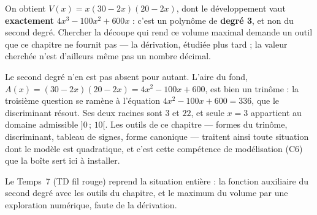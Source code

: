 On obtient $V(x) = x(30 - 2x)(20 - 2x)$, dont le développement vaut
\textbf{exactement} $4x^3 - 100x^2 + 600x$ : c'est un polynôme de
\textbf{degré 3}, et non du second degré. Chercher la découpe qui rend ce volume
maximal demande un outil que ce chapitre ne fournit pas — la dérivation, étudiée
plus tard ; la valeur cherchée n'est d'ailleurs même pas un nombre décimal.

Le second degré n'en est pas absent pour autant. L'aire du fond,
$A(x) = (30-2x)(20-2x) = 4x^2 - 100x + 600$, est bien un trinôme : la troisième
question se ramène à l'équation $4x^2 - 100x + 600 = 336$, que le discriminant
résout. Ses deux racines sont $3$ et $22$, et seule $x = 3$ appartient au domaine
admissible $]0\,;\,10[$. Les outils de ce chapitre — formes du trinôme,
discriminant, tableau de signes, forme canonique — traitent ainsi toute situation
dont le modèle est quadratique, et c'est cette compétence de modélisation (C6) que
la boîte sert ici à installer.

Le Temps~7 (TD fil rouge) reprend la situation entière : la fonction auxiliaire du
second degré avec les outils du chapitre, et le maximum du volume par une
exploration numérique, faute de la dérivation.

